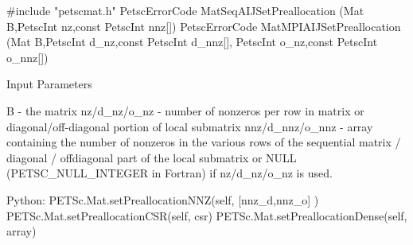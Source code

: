 #include "petscmat.h"
PetscErrorCode  MatSeqAIJSetPreallocation
  (Mat B,PetscInt nz,const PetscInt nnz[])
PetscErrorCode  MatMPIAIJSetPreallocation
  (Mat B,PetscInt d_nz,const PetscInt d_nnz[],
   PetscInt o_nz,const PetscInt o_nnz[])

Input Parameters

B - the matrix
nz/d_nz/o_nz - number of nonzeros per row in matrix or
    diagonal/off-diagonal portion of local submatrix
nnz/d_nnz/o_nnz - array containing the number of nonzeros in the various rows of
    the sequential matrix / diagonal / offdiagonal part of the local submatrix
    or NULL (PETSC_NULL_INTEGER in Fortran) if nz/d_nz/o_nz is used.

Python:
PETSc.Mat.setPreallocationNNZ(self, [nnz_d,nnz_o] )
PETSc.Mat.setPreallocationCSR(self, csr)
PETSc.Mat.setPreallocationDense(self, array)
